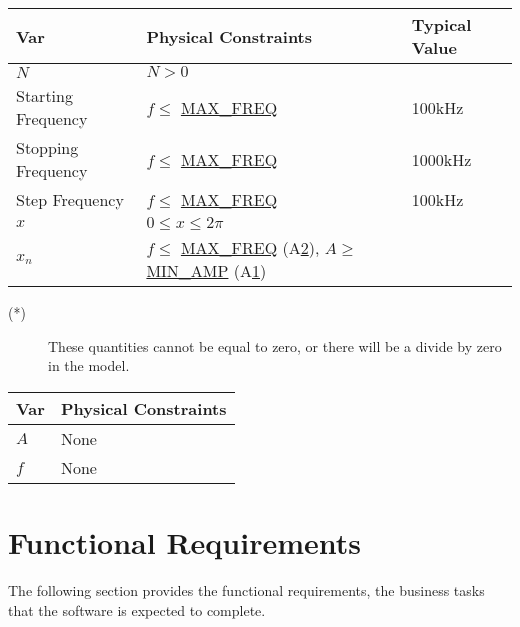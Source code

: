 \documentclass[12pt]{article}
\begin{document}
\begin{table}[!h]
\caption{Input Variables} \label{TblInputVar}
\renewcommand{\arraystretch}{1.2}
\noindent \begin{longtable*}{l l l} 
  \toprule
  \textbf{Var} & \textbf{Physical Constraints} & \textbf{Typical Value}\\
  \midrule 
  $N$ & $N>0$ \\
  Starting Frequency & $f \leq$ \hyperref[AppendA]{MAX\_FREQ} & 100kHz\\
  Stopping Frequency  & $f \leq$ \hyperref[AppendA]{MAX\_FREQ} & 1000kHz\\
  Step Frequency & $f \leq$ \hyperref[AppendA]{MAX\_FREQ} & 100kHz\\
  $x$ & $0 \leq x \leq 2 \pi$ & \\
  $x_n$ & $f \leq$ \hyperref[AppendA]{MAX\_FREQ} (A\hyperref[A_MaxFreq]{2}), $A 
\geq$ 
\hyperref[AppendA]{MIN\_AMP} (A\hyperref[A_MinVolt]{1}) &\\  
  \bottomrule
\end{longtable*}
\end{table}

\noindent \begin{description}
\item[(*)] These quantities cannot be equal to zero, or there will be a divide
  by zero in the model.
\end{description}

\begin{table}[!h]
\caption{Output Variables} \label{TblOutputVar}
\renewcommand{\arraystretch}{1.2}
\noindent \begin{longtable*}{l l} 
  \toprule
  \textbf{Var} & \textbf{Physical Constraints} \\
  \midrule 
  $A$ & None\\
  $f$ & None\\
  \bottomrule
\end{longtable*}
\end{table}

\section{Functional Requirements} \label{Func}

The following section provides the functional requirements, the business tasks
that the software is expected to complete.  

\end{document}
